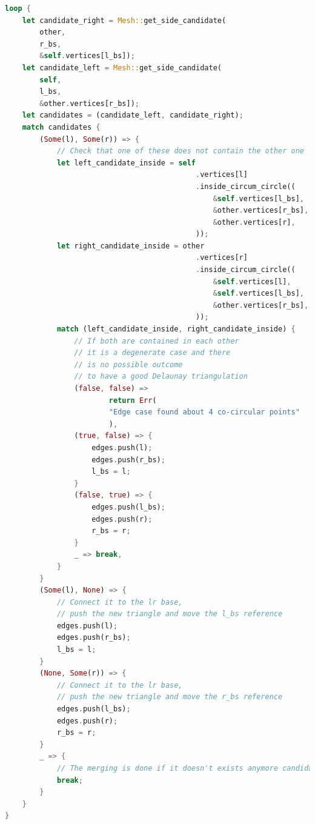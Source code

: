 \begin{lstlisting}[language=Rust, style=boxed]
loop {
    let candidate_right = Mesh::get_side_candidate(
        other,
        r_bs,
        &self.vertices[l_bs]);
    let candidate_left = Mesh::get_side_candidate(
        self,
        l_bs,
        &other.vertices[r_bs]);
    let candidates = (candidate_left, candidate_right);
    match candidates {
        (Some(l), Some(r)) => {
            // Check that one of these does not contain the other one
            let left_candidate_inside = self
                                            .vertices[l]
                                            .inside_circum_circle((
                                                &self.vertices[l_bs],
                                                &other.vertices[r_bs],
                                                &other.vertices[r],
                                            ));
            let right_candidate_inside = other
                                            .vertices[r]
                                            .inside_circum_circle((
                                                &self.vertices[l],
                                                &self.vertices[l_bs],
                                                &other.vertices[r_bs],
                                            ));
            match (left_candidate_inside, right_candidate_inside) {
                // If both are contained in each other
                // it is a degenerate case and there
                // is no possible outcome
                // to have a good Delaunay triangulation
                (false, false) => 
                        return Err(
                        "Edge case found about 4 co-circular points"
                        ),
                (true, false) => {
                    edges.push(l);
                    edges.push(r_bs);
                    l_bs = l;
                }
                (false, true) => {
                    edges.push(l_bs);
                    edges.push(r);
                    r_bs = r;
                }
                _ => break,
            }
        }
        (Some(l), None) => {
            // Connect it to the lr base,
            // push the new triangle and move the l_bs reference
            edges.push(l);
            edges.push(r_bs);
            l_bs = l;
        }
        (None, Some(r)) => {
            // Connect it to the lr base, 
            // push the new triangle and move the r_bs reference
            edges.push(l_bs);
            edges.push(r);
            r_bs = r;
        }
        _ => {
            // The merging is done if it doesn't exists anymore candidates
            break;
        }
    }
}
\end{lstlisting}

